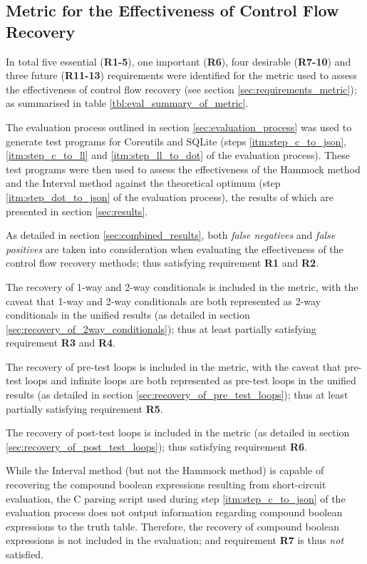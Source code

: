 
\subsection{Metric for the Effectiveness of Control Flow Recovery}
\label{sec:evaluation_metric}

In total five essential (\textbf{R1-5}), one important (\textbf{R6}), four desirable (\textbf{R7-10}) and three future (\textbf{R11-13}) requirements were identified for the metric used to assess the effectiveness of control flow recovery (see section \ref{sec:requirements_metric}); as summarised in table \ref{tbl:eval_summary_of_metric}.

The evaluation process outlined in section \ref{sec:evaluation_process} was used to generate test programs for Coreutils and SQLite (steps \ref{itm:step_c_to_json}, \ref{itm:step_c_to_ll} and \ref{itm:step_ll_to_dot} of the evaluation process). These test programs were then used to assess the effectiveness of the Hammock method and the Interval method against the theoretical optimum (step \ref{itm:step_dot_to_json} of the evaluation process), the results of which are presented in section \ref{sec:results}.

As detailed in section \ref{sec:combined_results}, both \textit{false negatives} and \textit{false positives} are taken into consideration when evaluating the effectiveness of the control flow recovery methods; thus satisfying requirement \textbf{R1} and \textbf{R2}.

The recovery of 1-way and 2-way conditionals is included in the metric, with the caveat that 1-way and 2-way conditionals are both represented as 2-way conditionals in the unified results (as detailed in section \ref{sec:recovery_of_2way_conditionals}); thus at least partially satisfying requirement \textbf{R3} and \textbf{R4}.

The recovery of pre-test loops is included in the metric, with the caveat that pre-test loops and infinite loops are both represented as pre-test loops in the unified results (as detailed in section \ref{sec:recovery_of_pre_test_loops}); thus at least partially satisfying requirement \textbf{R5}.

The recovery of post-test loops is included in the metric (as detailed in section \ref{sec:recovery_of_post_test_loops}); thus satisfying requirement \textbf{R6}.

While the Interval method (but not the Hammock method) is capable of recovering the compound boolean expressions resulting from short-circuit evaluation, the C parsing script used during step \ref{itm:step_c_to_json} of the evaluation process does not output information regarding compound boolean expressions to the truth table. Therefore, the recovery of compound boolean expressions is not included in the evaluation; and requirement \textbf{R7} is thus \textit{not} satisfied.

